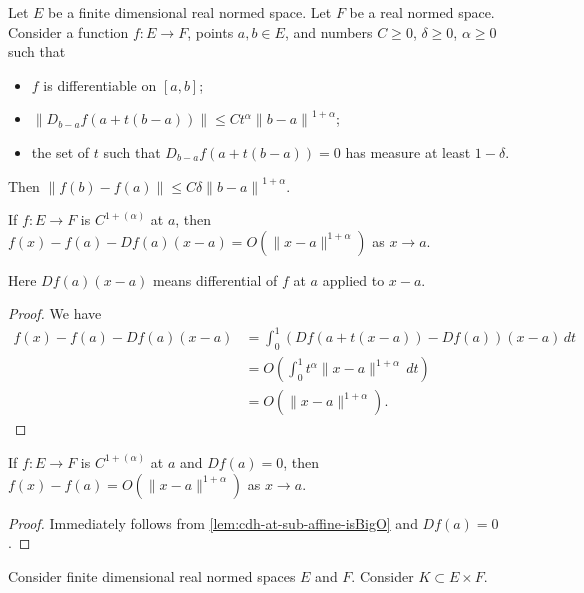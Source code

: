 \begin{lemma}%
  \label{lem:cdh-at-sub-affine-le-of-meas}
  Let \(E\) be a finite dimensional real normed space.
  Let \(F\) be a real normed space.
  Consider a function \(f\colon E\to F\), points \(a, b \in E\),
  and numbers \(C\ge 0\), \(\delta\ge 0\), \(\alpha\ge 0\) such that
  \begin{itemize}
  \item \(f\) is differentiable on \([a, b]\);
  \item \(\|D_{b - a}f(a + t(b - a))\| \le Ct^{\alpha}{\|b - a\|}^{1+\alpha}\);
  \item the set of \(t\) such that \(D_{b - a}f(a + t(b - a)) = 0\)
    has measure at least \(1 - \delta\).
  \end{itemize}
  Then \(\|f(b) - f(a)\| \le C\delta{\|b - a\|}^{1+\alpha}\).
\end{lemma}

\begin{lemma}%
  \label{lem:cdh-at-sub-affine-isBigO}
  If \(f\colon E \to F\) is \(C^{1+(\alpha)}\) at \(a\),
  then \(f(x) - f(a) - Df(a)(x - a) = O\left(\|x - a\|^{1 + \alpha}\right)\) as \(x \to a\).
\end{lemma}
Here \(Df(a)(x - a)\) means differential of \(f\) at \(a\) applied to \(x - a\).

\begin{proof}
  We have
  \begin{align*}
    f(x) - f(a) - Df(a)(x - a) &= \int_{0}^{1}\left(Df(a + t(x - a)) - Df(a)\right)(x - a)\,dt\\
                               &= O\left(\int_{0}^{1}t^{\alpha}\|x - a\|^{1+\alpha}\,dt\right)\\
                               &= O\left(\|x - a\|^{1 + \alpha}\right).
  \end{align*}
\end{proof}

\begin{corollary}%
  \label{cor:cdh-at-sub-isBigO}
  If \(f\colon E \to F\) is \(C^{1+(\alpha)}\) at \(a\) and \(Df(a) = 0\),
  then \(f(x) - f(a) = O\left(\|x - a\|^{1 + \alpha}\right)\) as \(x \to a\).
\end{corollary}

\begin{proof}
  Immediately follows from \autoref{lem:cdh-at-sub-affine-isBigO} and \(Df(a) = 0\).
\end{proof}


\begin{lemma}%
  \label{lem:chart-one-deriv-zero-bdd}
  Consider finite dimensional real normed spaces \(E\) and \(F\).
  Consider \(K \subset E \times F\).
\end{lemma}


